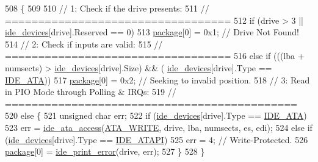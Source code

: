 \begin{DoxyCode}
508                                                             \{
509  
510    \textcolor{comment}{// 1: Check if the drive presents:}
511    \textcolor{comment}{// ==================================}
512    \textcolor{keywordflow}{if} (drive > 3 || \hyperlink{a00035_ab97a828ed4839b575dc382e2bf826e87_ab97a828ed4839b575dc382e2bf826e87}{ide\_devices}[drive].Reserved == 0)
513       \hyperlink{a00035_a820b2230ab700e13350794494bd4a60f_a820b2230ab700e13350794494bd4a60f}{package}[0] = 0x1;      \textcolor{comment}{// Drive Not Found!}
514    \textcolor{comment}{// 2: Check if inputs are valid:}
515    \textcolor{comment}{// ==================================}
516    \textcolor{keywordflow}{else} \textcolor{keywordflow}{if} (((lba + numsects) > \hyperlink{a00035_ab97a828ed4839b575dc382e2bf826e87_ab97a828ed4839b575dc382e2bf826e87}{ide\_devices}[drive].Size) && (
      \hyperlink{a00035_ab97a828ed4839b575dc382e2bf826e87_ab97a828ed4839b575dc382e2bf826e87}{ide\_devices}[drive].Type == \hyperlink{a00032_a3046279f2a25227c121b69f4cf855bf8_a3046279f2a25227c121b69f4cf855bf8}{IDE\_ATA}))
517       \hyperlink{a00035_a820b2230ab700e13350794494bd4a60f_a820b2230ab700e13350794494bd4a60f}{package}[0] = 0x2;                     \textcolor{comment}{// Seeking to invalid position.}
518    \textcolor{comment}{// 3: Read in PIO Mode through Polling & IRQs:}
519    \textcolor{comment}{// ============================================}
520    \textcolor{keywordflow}{else} \{
521       \textcolor{keywordtype}{unsigned} \textcolor{keywordtype}{char} err;
522       \textcolor{keywordflow}{if} (\hyperlink{a00035_ab97a828ed4839b575dc382e2bf826e87_ab97a828ed4839b575dc382e2bf826e87}{ide\_devices}[drive].Type == \hyperlink{a00032_a3046279f2a25227c121b69f4cf855bf8_a3046279f2a25227c121b69f4cf855bf8}{IDE\_ATA})
523          err = \hyperlink{a00032_a4da0883393a98b937fdc3015a0a3f265_a4da0883393a98b937fdc3015a0a3f265}{ide\_ata\_access}(\hyperlink{a00032_a9a19b84aa7a02ac7e07528795816ffb2_a9a19b84aa7a02ac7e07528795816ffb2}{ATA\_WRITE}, drive, lba, numsects, es, edi);
524       \textcolor{keywordflow}{else} \textcolor{keywordflow}{if} (\hyperlink{a00035_ab97a828ed4839b575dc382e2bf826e87_ab97a828ed4839b575dc382e2bf826e87}{ide\_devices}[drive].Type == \hyperlink{a00032_a6513ee2a4da2c6aaa691b9d4c639a53e_a6513ee2a4da2c6aaa691b9d4c639a53e}{IDE\_ATAPI})
525          err = 4; \textcolor{comment}{// Write-Protected.}
526       \hyperlink{a00035_a820b2230ab700e13350794494bd4a60f_a820b2230ab700e13350794494bd4a60f}{package}[0] = \hyperlink{a00032_af7757307613c29c9bcbf0f8f5b2feee5_af7757307613c29c9bcbf0f8f5b2feee5}{ide\_print\_error}(drive, err);
527    \}
528 \}
\end{DoxyCode}


